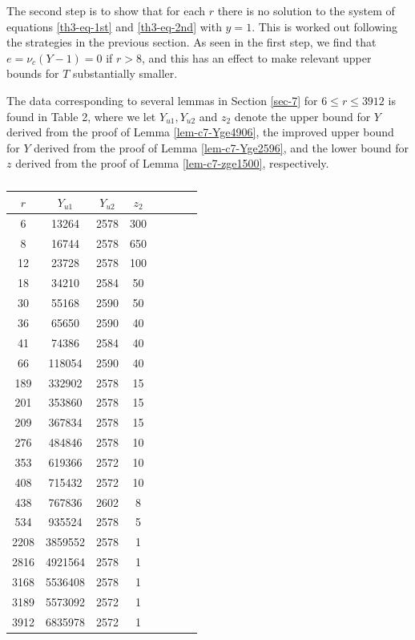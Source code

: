 \documentclass[11pt]{amsart}
\numberwithin{equation}{section}
\begin{document}
The second step is to show that for each $r$ there is no solution to the system of equations \eqref{th3-eq-1st} and \eqref{th3-eq-2nd} with $y=1$.
This is worked out following the strategies in the previous section.
As seen in the first step, we find that $e=\nu_c(Y-1)=0$ if $r>8$, and this has an effect to make relevant upper bounds for $T$ substantially smaller.

The data corresponding to several lemmas in Section \ref{sec-7} for $6 \le r \le 3912$ is found in Table 2, where we let $Y_{u1}, Y_{u2}$ and $z_2$ denote the upper bound for $Y$ derived from the proof of Lemma \ref{lem-c7-Yge4906}, the improved upper bound for $Y$ derived from the proof of Lemma \ref{lem-c7-Yge2596}, and the lower bound for $z$ derived from the proof of Lemma \ref{lem-c7-zge1500}, respectively.
%
\begin{table}[h]
\caption{}
\begin{tabular}{cccccccc}
$r$ & $Y_{u1}$ & $Y_{u2}$ & $z_2$ \\ \hline
6  & 13264 & 2578 & 300 \\ %
8  & 16744 & 2578 & 650 \\ %
12  & 23728 & 2578 & 100\\ %
18  & 34210 & 2584 &  50\\ %
30  & 55168 & 2590 & 50 \\ %
36  & 65650 & 2590 & 40\\%
41  & 74386 & 2584 & 40\\ %
66  & 118054 & 2590 & 40 \\ %
189  & 332902 & 2578 & 15 \\ %
201  & 353860 & 2578 & 15\\ %
209  & 367834 & 2578 &  15\\ %
276  & 484846& 2578&10 \\ %
353  & 619366& 2572&10 \\ %
408  & 715432& 2572&10 \\ %
438 & 767836& 2602&8 \\ %
534  & 935524&2578& 5 \\ %
2208  & 3859552&2578& 1 \\ %
2816  & 4921564&2578& 1 \\ %
3168  & 5536408&2578& 1 \\ %
3189  & 5573092& 2572&1 \\ %
3912  & 6835978& 2572&1 \\ \hline %
\end{tabular}
\end{table}
\end{document}
